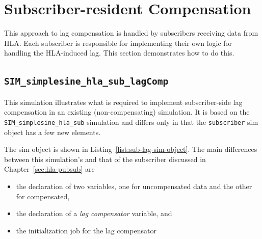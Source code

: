 \clearpage

\section{Subscriber-resident Compensation}

This approach to lag compensation is handled by subscribers receiving
data from HLA.
Each subscriber is responsible for implementing their own logic for handling
the HLA-induced lag.
This section demonstrates how to do this.

\subsection{{\tt SIM\_simplesine\_hla\_sub\_lagComp}}

This simulation illustrates what is required to implement
subscriber-side lag compensation in an existing (non-compensating)
simulation.
It is based on the {\tt SIM\_simplesine\_hla\_sub} simulation and differs
only in that the {\tt subscriber} sim object has a few new elements.

The sim object is shown in Listing~\ref{list:sub-lag-sim-object}.
The main differences between this simulation's \sdefine and that of the
subscriber discussed in Chapter~\ref{sec:hla-pubsub} are
\begin{itemize}
\item{
  the declaration of two \simplesine variables,
  one for uncompensated data and the other for compensated,
}
\item{
  the declaration of a {\em lag compensator} variable, and
}
\item{
  the initialization job for the lag compensator
}
\end{itemize}

